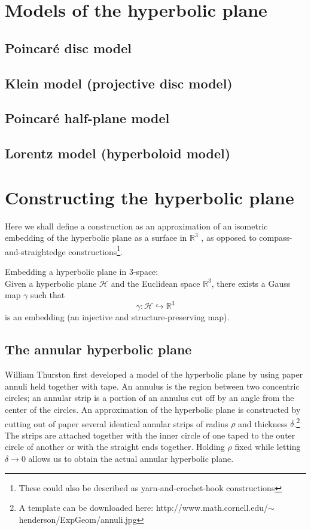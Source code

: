 \documentclass[letterpaper,titlepage]{article}
\begin{document}
\section{Models of the hyperbolic plane}
\subsection{Poincar\'e disc model}
\subsection{Klein model (projective disc model)}
\subsection{Poincar\'e half-plane model}
\subsection{Lorentz model (hyperboloid model)}

\section{Constructing the hyperbolic plane}
Here we shall define a construction as an approximation of an isometric embedding of the hyperbolic plane as a surface in $\mathbb{R}^3$ \cite{crochetplane}, as opposed to compass-and-straightedge constructions\footnote{These could also be described as yarn-and-crochet-hook constructions}.
 
Embedding a hyperbolic plane in 3-space:\\
Given a hyperbolic plane $\mathcal{H}$ and the Euclidean space $\mathbb{R}^3$, there exists a Gauss map $\gamma$ such that
\[ \gamma : \mathcal{H} \hookrightarrow \mathbb{R}^3 \]
is an embedding (an injective and structure-preserving map).

\subsection{The annular hyperbolic plane}
William Thurston first developed a model of the hyperbolic plane by using paper annuli held together with tape.\cite{thurston}
An annulus is the region between two concentric circles; an annular strip is a portion of an annulus cut off by an angle from the center of the circles.\cite{crochetplane}
An approximation of the hyperbolic plane is constructed by cutting out of paper several identical annular strips of radius $\rho$ and thickness $\delta$.\footnote{A template can be downloaded here: http://www.math.cornell.edu/$\sim$henderson/ExpGeom/annuli.jpg}
The strips are attached together with the inner circle of one taped to the outer circle of another or with the straight ends together.
Holding $\rho$ fixed while letting $\delta \to 0$ allows us to obtain the actual annular hyperbolic plane.\cite{adventures}
\end{document}
